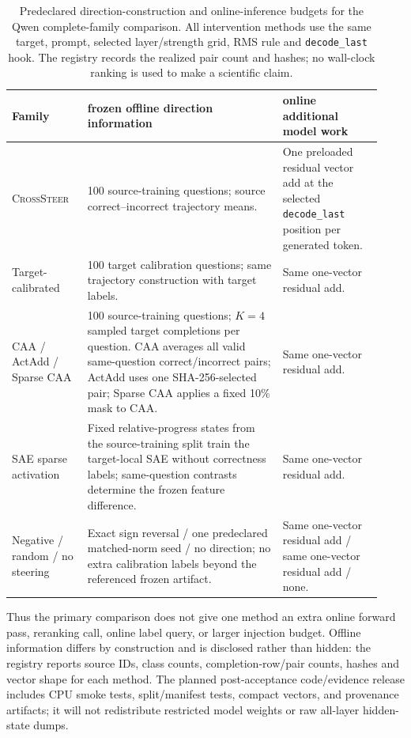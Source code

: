 \begin{table}[tbp]
\centering
\scriptsize
\setlength{\tabcolsep}{3pt}
\caption{Predeclared direction-construction and online-inference budgets for the
Qwen complete-family comparison.  All intervention methods use the same target,
prompt, selected layer/strength grid, RMS rule and \texttt{decode\_last} hook.
The registry records the realized pair count and hashes; no wall-clock ranking is
used to make a scientific claim.}
\label{tab:steering-budget}
\begin{tabular}{@{}p{0.19\linewidth}p{0.49\linewidth}p{0.25\linewidth}@{}}
\toprule
Family & frozen offline direction information & online additional model work \\
\midrule
\textsc{CrossSteer} & 100 source-training questions; source correct--incorrect trajectory means. & One preloaded residual vector add at the selected \texttt{decode\_last} position per generated token. \\
Target-calibrated & 100 target calibration questions; same trajectory construction with target labels. & Same one-vector residual add. \\
CAA / ActAdd / Sparse CAA & 100 source-training questions; $K{=}4$ sampled target completions per question.  CAA averages all valid same-question correct/incorrect pairs; ActAdd uses one SHA-256-selected pair; Sparse CAA applies a fixed 10\% mask to CAA. & Same one-vector residual add. \\
SAE sparse activation & Fixed relative-progress states from the source-training split train the target-local SAE without correctness labels; same-question contrasts determine the frozen feature difference. & Same one-vector residual add. \\
Negative / random / no steering & Exact sign reversal / one predeclared matched-norm seed / no direction; no extra calibration labels beyond the referenced frozen artifact. & Same one-vector residual add / same one-vector residual add / none. \\
\bottomrule
\end{tabular}
\end{table}

Thus the primary comparison does not give one method an extra online forward
pass, reranking call, online label query, or larger injection budget.  Offline
information differs by construction and is disclosed rather than hidden: the
registry reports source IDs, class counts, completion-row/pair counts, hashes and
vector shape for each method.  The planned post-acceptance code/evidence release includes CPU smoke tests,
split/manifest tests, compact vectors, and provenance artifacts; it will not
redistribute restricted model weights or raw all-layer hidden-state dumps.

